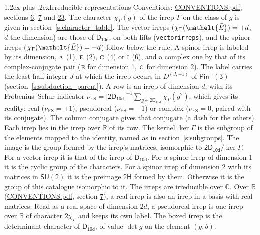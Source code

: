 \documentclass[10pt,a4paper]{article}
\makeatletter
\renewcommand\section{\@startsection{section}{1}{\z@}{-3ex plus -1ex minus -.2ex}%
  {1.2ex plus .2ex}{\normalfont\large\sffamily\bfseries\color{parttitle}}}
\numberwithin{equation}{section}
\newcommand{\eltfont}[1]{{\let\sigma\eltsigma\mathelt{#1}}}
\newcommand{\grp}[1]{\mathsf{#1}}
\newcommand{\irr}[1]{\text{\normalfont\scshape #1}}
\newcommand{\elt}[1]{\eltfont{#1}}
\newcommand{\irrJp}[2]{D^{(#1,#2)}}
\newcommand{\irchar}[1]{\chi_{#1}}
\newcommand{\fsind}{\nu_{\mathrm{FS}}}
\newcommand{\barred}[1]{\bar{#1}}
\makeatother
\begin{document}
\section{Irreducible representations}\label{s:irreps}
Conventions: \href{../../CONVENTIONS.pdf}{CONVENTIONS.pdf}, sections \href{../../../rotation/CONVENTIONS.pdf\#conv.6}{6}, \href{../../../rotation/CONVENTIONS.pdf\#conv.7}{7} and \href{../../CONVENTIONS.pdf\#conv.23}{23}.
\leavevmode\label{n:function.character}\label{n:irrep.Gamma}The character $\irchar{\Gamma}(g)$ of the irrep $\Gamma$ on the class of $g$ is given in section~\ref{s:character_table}. \label{n:index.dimension}The vector irreps ($\irchar{\Gamma}(\elt{\barred{E}}) = +d$, $d$ the dimension) are those of \href{../../../rotation/data/pdf/D10d.pdf}{$\grp{D_{10d}}$}, on both lifts (\texttt{vectorirreps}), and the spinor irreps ($\irchar{\Gamma}(\elt{\barred{E}}) = -d$) follow below the rule. A spinor irrep is labeled by its dimension, $\irr{a}$ (1), $\irr{e}$ (2), $\irr{g}$ (4) or $\irr{i}$ (6), and a complex one by that of its complex-conjugate pair ($\irr{e}$ for dimension 1, $\irr{g}$ for dimension 2). The label carries the least half-integer $J$ at which the irrep occurs in $\irrJp{J}{+1}$ of $\grp{Pin^{-}(3)}$ (section~\ref{s:subduction_parent}).
\leavevmode\label{n:index.frobenius}\label{n:head.irrep}\label{n:head.reality}A row is an irrep of dimension $d$, with its Frobenius--Schur indicator $\fsind = |\grp{2D_{10d}}|^{-1}\allowbreak\sum_{g\in\grp{2D_{10d}}}\irchar{\Gamma}(g^2)$, which gives its reality: real ($\fsind = +1$), pseudoreal ($\fsind = -1$) or complex ($\fsind = 0$, paired with its conjugate). \label{n:head.conjugate}The column conjugate gives that conjugate (a dash for the others). \label{n:head.over.real}Each irrep lies in the irrep over $\mathbb{R}$ of its row. \label{n:head.kernel}The kernel $\ker\Gamma$ is the subgroup of the elements mapped to the identity, named as in section~\ref{s:subgroups}. \label{n:head.image}The image is the group formed by the irrep's matrices, isomorphic to $\grp{2D_{10d}}/\ker\Gamma$. For a vector irrep it is that of the irrep of \href{../../../rotation/data/pdf/D10d.pdf}{$\grp{D_{10d}}$}. For a spinor irrep of dimension 1 it is the cyclic group of the characters. For a spinor irrep of dimension 2 with its matrices in $\grp{SU(2)}$ it is the preimage $\grp{2H}$ formed by them. Otherwise it is the group of this catalogue isomorphic to it. The irreps are irreducible over $\mathbb{C}$. Over $\mathbb{R}$ (\href{../../CONVENTIONS.pdf}{CONVENTIONS.pdf}, section \href{../../../rotation/CONVENTIONS.pdf\#conv.7}{7}), a real irrep is also an irrep in a basis with real matrices. Read as a real space of dimension $2d$, a pseudoreal irrep is one irrep over $\mathbb{R}$ of character $2\irchar{\Gamma}$ and keeps its own label. \label{n:mark.determinant}The boxed irrep is the determinant character of \href{../../../rotation/data/pdf/D10d.pdf}{$\grp{D_{10d}}$}, of value $\det g$ on the element $(g, b)$.
\end{document}
